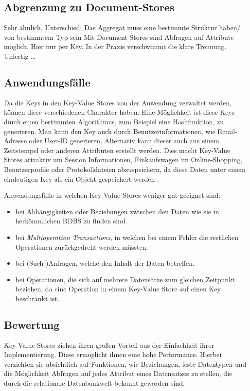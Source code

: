\subsection{Abgrenzung zu Document-Stores}
Sehr ähnlich, Unterschied: Das Aggregat muss eine bestimmte Struktur haben/ von bestimmtem Typ sein
Mit Document Stores sind Abfragen auf Attribute möglich. Hier nur per Key.
In der Praxis verschwimmt die klare Trennung.
Unfertig …

\subsection{Anwendungsfälle}
Da die Keys in den Key-Value Stores von der Anwendung verwaltet werden, können diese verschiedenen Charakter haben. Eine Möglichkeit ist diese Keys durch einen bestimmten Algorithmus, zum Beispiel eine Hashfunktion, zu generieren. Man kann den Key auch durch Benutzerinformationen, wie Email-Adresse oder User-ID generieren. Alternativ kann dieser auch aus einem Zeitstempel oder anderen Attributen erstellt werden. Dies macht Key-Value Stores attraktiv um Session Informationen, Einkaufswagen im Online-Shopping, Benutzerprofile oder Protokolldateien abzuspeichern, da diese Daten unter einem eindeutigen Key als ein Objekt gespeichert werden \cite{sadalage01}. 

Anwendungsfälle in welchen Key-Value Stores weniger gut geeignet sind:
\begin{itemize}
\item bei Abhängigkeiten oder Beziehungen zwischen den Daten wie sie in herkömmlichen RDBS zu finden sind.
\item bei \textit{Multioperation Transactions}, in welchen bei einem Fehler die restlichen Operationen zurückgedreht werden müssten.
\item bei (Such-)Anfragen, welche den Inhalt der Daten betreffen.
\item bei Operationen, die sich auf mehrere Datensätze zum gleichen Zeitpunkt beziehen, da eine Operation in einem Key-Value Store auf einen Key beschränkt ist.
\end{itemize}

\subsection{Bewertung}
Key-Value Stores ziehen ihren großen Vorteil aus der Einfachheit ihrer Implementierung. Diese ermöglicht ihnen eine hohe Performance. Hierbei verzichten sie absichtlich auf Funktionen, wie Beziehungen, feste Datentypen und die Möglichkeit Abfragen auf jedes Attribut eines Datensatzes zu stellen, die durch die relationale Datenbankwelt bekannt geworden sind. 